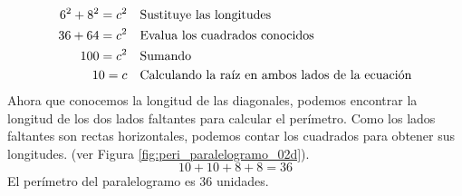 \begin{solutionbox}{16cm}
\begin{minipage}{0.65\textwidth}
\begin{align*}
            6^2+8^2  =c^2 & \text{\quad Sustituye las longitudes}                         \\
            36 +64 =c^2   & \text{\quad Evalua los cuadrados conocidos}                   \\
            100=c^2       & \text{\quad Sumando }                                         \\
            10=c          & \text{\quad Calculando la raíz en ambos lados de la ecuación} \\
        \end{align*}
        Ahora que conocemos la longitud de las diagonales, podemos encontrar la longitud de los dos lados faltantes para calcular el perímetro.
        Como los lados faltantes son rectas horizontales, podemos contar los cuadrados para obtener sus longitudes. (ver Figura \ref{fig:peri_paralelogramo_02d}).
        \[10+10+8+8=36\]
        El perímetro del paralelogramo es 36 unidades.
    \end{minipage}
\end{solutionbox}

